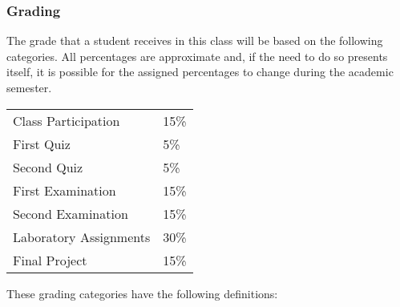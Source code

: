 \documentclass[11pt]{article} %
\begin{document}
\subsubsection*{Grading}

The grade that a student receives in this class will be based on the following categories. All percentages are
approximate and, if the need to do so presents itself, it is possible for the assigned percentages to change during the
academic semester. 
\color{red}
\begin{center}
  \begin{tabular}{l|l}
\hline
    Class Participation & 15\% \\  %
    First Quiz & 5\% \\
    Second Quiz & 5\% \\
    First Examination & 15\% \\
    Second Examination & 15\% \\
    Laboratory  Assignments & 30\% \\
    Final Project & 15\% \\
\hline
  \end{tabular}
\end{center}
\color{black}
\noindent
These grading categories have the following definitions:
\vspace*{-.05in}



\color{black}
\end{document}
